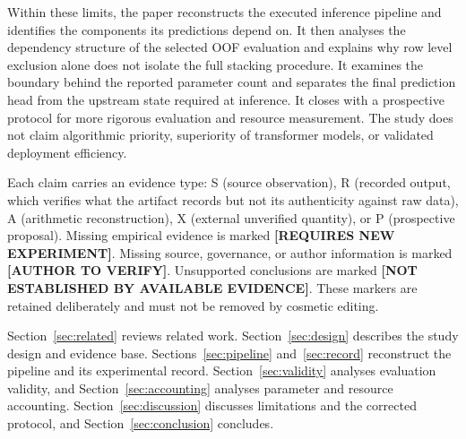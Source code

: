 \documentclass[runningheads]{llncs}
\newcommand{\needexp}{\textbf{[REQUIRES NEW EXPERIMENT]}}
\newcommand{\verifyauthor}{\textbf{[AUTHOR TO VERIFY]}}
\newcommand{\notestablished}{\textbf{[NOT ESTABLISHED BY AVAILABLE EVIDENCE]}}
\begin{document}
Within these limits, the paper reconstructs the executed inference pipeline and identifies the components its predictions depend on. It then analyses the dependency structure of the selected OOF evaluation and explains why row level exclusion alone does not isolate the full stacking procedure. It examines the boundary behind the reported parameter count and separates the final prediction head from the upstream state required at inference. It closes with a prospective protocol for more rigorous evaluation and resource measurement. The study does not claim algorithmic priority, superiority of transformer models, or validated deployment efficiency.

Each claim carries an evidence type: S (source observation), R (recorded output, which verifies what the artifact records but not its authenticity against raw data), A (arithmetic reconstruction), X (external unverified quantity), or P (prospective proposal). Missing empirical evidence is marked \textbf{[REQUIRES NEW EXPERIMENT]}. Missing source, governance, or author information is marked \textbf{[AUTHOR TO VERIFY]}. Unsupported conclusions are marked \textbf{[NOT ESTABLISHED BY AVAILABLE EVIDENCE]}. These markers are retained deliberately and must not be removed by cosmetic editing.

Section~\ref{sec:related} reviews related work. Section~\ref{sec:design} describes the study design and evidence base. Sections~\ref{sec:pipeline} and~\ref{sec:record} reconstruct the pipeline and its experimental record. Section~\ref{sec:validity} analyses evaluation validity, and Section~\ref{sec:accounting} analyses parameter and resource accounting. Section~\ref{sec:discussion} discusses limitations and the corrected protocol, and Section~\ref{sec:conclusion} concludes.
















\end{document}
